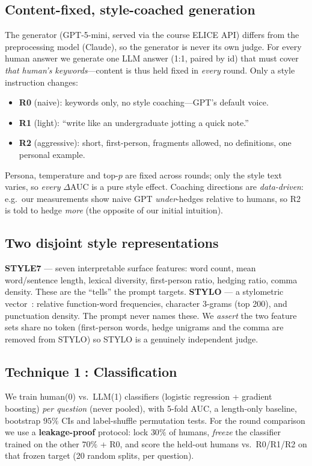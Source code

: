 \documentclass[10pt,twocolumn]{article}
\begin{document}
\subsection{Content-fixed, style-coached generation}
The generator (GPT-5-mini, served via the course ELICE API) differs from the
preprocessing model (Claude), so the generator is never its own judge. For every human
answer we generate one LLM answer (1:1, paired by id) that must cover \emph{that human's
keywords}---content is thus held fixed in \emph{every} round. Only a style instruction
changes:
\begin{itemize}\setlength\itemsep{0pt}
  \item \textbf{R0} (naive): keywords only, no style coaching---GPT's default voice.
  \item \textbf{R1} (light): ``write like an undergraduate jotting a quick note.''
  \item \textbf{R2} (aggressive): short, first-person, fragments allowed, no definitions,
        one personal example.
\end{itemize}
Persona, temperature and top-$p$ are fixed across rounds; only the style text varies, so
\emph{every} $\Delta$AUC is a pure style effect. Coaching directions are
\emph{data-driven}: e.g.\ our measurements show naive GPT \emph{under}-hedges relative to
humans, so R2 is told to hedge \emph{more} (the opposite of our initial intuition).

\subsection{Two disjoint style representations}
\textbf{STYLE7} --- seven interpretable surface features: word count, mean word/sentence
length, lexical diversity, first-person ratio, hedging ratio, comma density. These are the
``tells'' the prompt targets. \textbf{STYLO} --- a stylometric vector~\cite{mosteller1964,stamatatos2009}: relative
function-word frequencies, character 3-grams (top 200), and punctuation density. The prompt
never names these. We \emph{assert} the two feature sets share no token (first-person words,
hedge unigrams and the comma are removed from STYLO) so STYLO is a genuinely independent
judge.

\subsection{Technique \textcircled{1}: Classification}
We train human(0) vs.\ LLM(1) classifiers (logistic regression + gradient boosting)
\emph{per question} (never pooled), with 5-fold AUC, a length-only baseline, bootstrap
$95\%$ CIs and label-shuffle permutation tests. For the round comparison we use a
\textbf{leakage-proof} protocol: lock $30\%$ of humans, \emph{freeze} the classifier
trained on the other $70\%$ + R0, and score the held-out humans vs.\ R0/R1/R2 on that frozen
target (20 random splits, per question).
\end{document}

